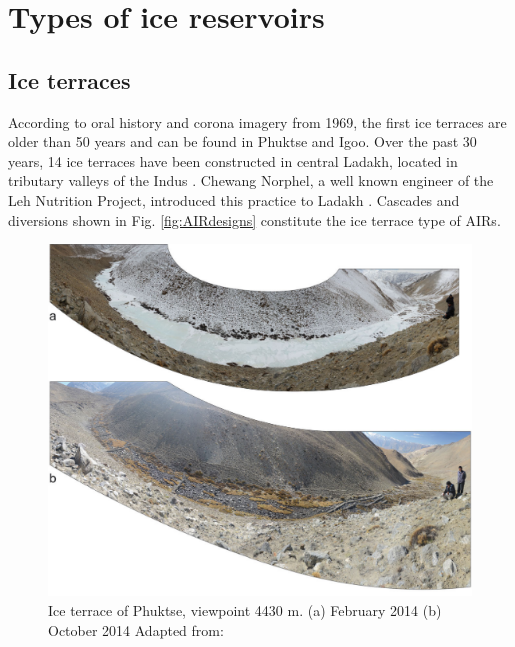 \section{Types of ice reservoirs}

\subsection{Ice terraces}

According to oral history and corona imagery from 1969, the first ice terraces are older than 50 years and can
be found in Phuktse and Igoo. Over the past 30 years, 14 ice terraces have been constructed in central Ladakh,
located in tributary valleys of the Indus \citep{norphelArtificialGlacierHigh2009,
nusserSociohydrologyArtificialGlaciers2019}. Chewang Norphel, a well known engineer of the Leh Nutrition
Project, introduced this practice to Ladakh \citep{vinceGlacierMan2009}. Cascades and diversions shown in Fig.
\ref{fig:AIRdesigns} constitute the ice terrace type of AIRs.

\begin{figure}[htb]
\centering
\includegraphics[width=\textwidth]{figs/IT_example.png}
\caption{Ice terrace of Phuktse, viewpoint 4430 m. (a) February 2014 (b) October 2014 Adapted from: \cite{nusserSociohydrologyArtificialGlaciers2019}}
\label{fig:ITexample}
\end{figure}

